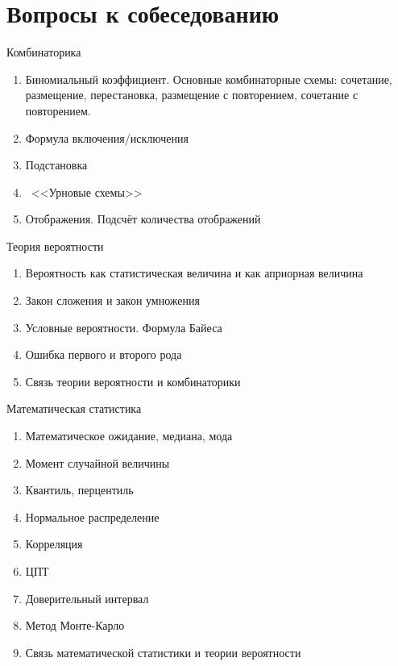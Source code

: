   \section{Вопросы к собеседованию}\label{section:quastions}
  
  \begin{frame}{Комбинаторика}
  \begin{enumerate}
  	\item Биномиальный коэффициент. Основные комбинаторные схемы: сочетание, размещение, перестановка, размещение с повторением, сочетание с повторением.
  	\item Формула включения/исключения
  	\item Подстановка
  	\item ~<<Урновые схемы>>
  	\item Отображения. Подсчёт количества отображений
  \end{enumerate}
  \end{frame}
  
  \begin{frame}{Теория вероятности}
  \begin{enumerate}
    \item Вероятность как статистическая величина и как априорная величина
    \item Закон сложения и закон умножения
    \item Условные вероятности. Формула Байеса
    \item Ошибка первого и второго рода
    \item Связь теории вероятности и комбинаторики
   \end{enumerate}
   \end{frame}
 
  \begin{frame}{Математическая статистика}
  \begin{enumerate}
    \item Математическое ожидание, медиана, мода
    \item Момент случайной величины
    \item Квантиль, перцентиль
    \item Нормальное распределение
    \item Корреляция
    \item ЦПТ
    \item Доверительный интервал
    \item Метод Монте-Карло
    \item Связь математической статистики и теории вероятности
 \end{enumerate}  
\end{frame}

